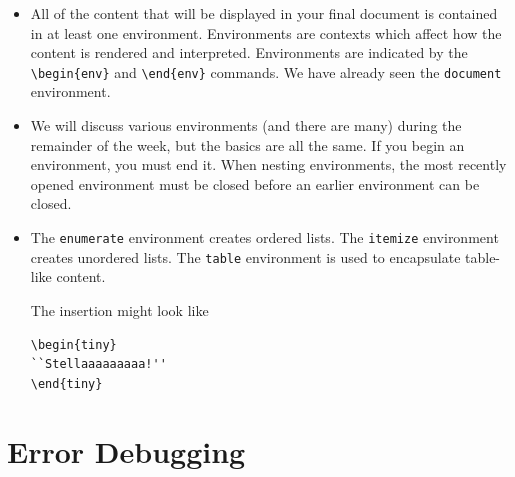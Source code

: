 \begin{itemize}
\item All of the content that will be displayed in your final document is
  contained in at least one environment. Environments are contexts which affect
  how the content is rendered and interpreted. Environments are indicated by the
  \verb=\begin{env}= and \verb=\end{env}= commands. We have already seen the
  \texttt{document} environment.

\item We will discuss various environments (and there are many) during the
  remainder of the week, but the basics are all the same. If you begin
  an environment, you must end it. When nesting environments, the most
  recently opened environment must be closed before an earlier
  environment can be closed.

\item The \texttt{enumerate} environment creates ordered lists. The
  \texttt{itemize} environment creates unordered lists. The
  \texttt{table} environment is used to encapsulate table-like content.


The insertion might look like

\begin{center}
  \begin{minipage}{.8\linewidth}
    \begin{framed}
\begin{verbatim}
\begin{tiny}
``Stellaaaaaaaaa!''
\end{tiny}
\end{verbatim}
    \end{framed}
  \end{minipage}
\end{center}

\end{itemize}

\section{Error Debugging}

